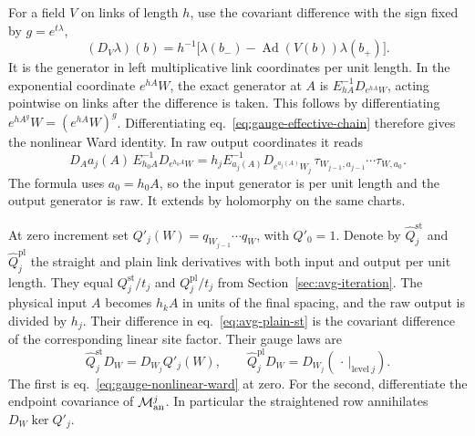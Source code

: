 \documentclass[11pt,letterpaper,reqno]{amsart}
\numberwithin{equation}{section}
\renewcommand{\eqref}[1]{\textup{eq.~\ref{#1}}}
\theoremstyle{definition}
\theoremstyle{remark}
\begin{document}
For a field \(V\) on links of length \(h\), use the covariant
difference with the sign fixed by \(g=e^{t\lambda}\),
\begin{equation}\label{eq:gauge-D}
 (D_V\lambda)(b)=h^{-1}
     \big[\lambda(b_-)-\operatorname{Ad}(V(b))\lambda(b_+)\big].
\end{equation}
It is the generator in left multiplicative link coordinates per unit
length. In the exponential coordinate \(e^{hA}W\), the exact generator
at \(A\) is \(E_{hA}^{-1}D_{e^{hA}W}\), acting pointwise on links after
the difference is taken. This follows by differentiating
\(e^{hA^g}W=(e^{hA}W)^g\).
Differentiating \eqref{eq:gauge-effective-chain} therefore gives the
nonlinear Ward identity. In raw output coordinates it reads
\begin{equation}\label{eq:gauge-nonlinear-ward}
 D_Aa_j(A)\,E_{h_0 A}^{-1}D_{e^{h_0A}W}
  =h_j E_{a_j(A)}^{-1}D_{e^{a_j(A)}W_j}\,
     \tau_{W_{j-1},a_{j-1}}\cdots\tau_{W,a_0}.
\end{equation}
The formula uses \(a_0=h_0A\), so the input generator is per unit
length and the output generator is raw. It extends by
holomorphy on the same charts.

At zero increment set \(Q'_j(W)=q_{W_{j-1}}\cdots q_W\), with
\(Q'_0=1\). Denote by \(\widehat Q^{\mathrm{st}}_j\) and
\(\widehat Q^{\mathrm{pl}}_j\) the straight and plain link derivatives
with both input and output per unit length. They equal
\(Q^{\mathrm{st}}_j/t_j\) and \(Q^{\mathrm{pl}}_j/t_j\) from
Section~\ref{sec:avg-iteration}. The physical input \(A\) becomes
\(h_kA\) in units of the final spacing, and the raw output is
divided by \(h_j\). Their difference in \eqref{eq:avg-plain-st}
is the covariant difference of the corresponding linear site
factor. Their gauge laws are
\begin{equation}\label{eq:gauge-row-ward}
 \widehat Q^{\mathrm{st}}_jD_W=D_{W_j}Q'_j(W),\qquad
 \widehat Q^{\mathrm{pl}}_jD_W=D_{W_j}(\,\cdot\,|_{\mathrm{level}\ j}).
\end{equation}
The first is \eqref{eq:gauge-nonlinear-ward} at zero. For the second,
differentiate the endpoint covariance of \(\mathcal M_{\rm an}^j\).
In particular the straightened row annihilates \(D_W\ker Q'_j\).
\end{document}
